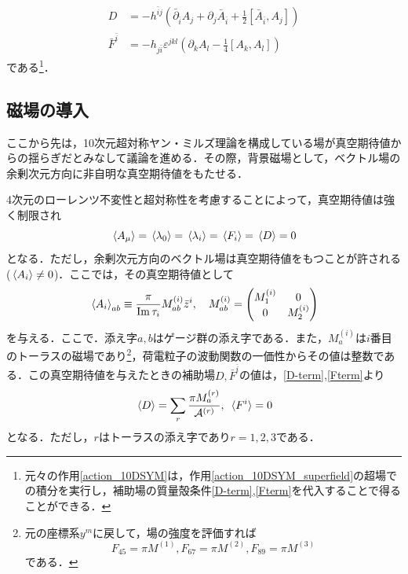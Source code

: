 \documentclass[a4paper,uplatex,dvipdfmx,10pt]{jsarticle}
\theoremstyle{definition}
\begin{document}
\begin{align}
   D
   &=
   -
   h^{\bar{i}j}
   \left(  
      \bar{\partial}_{\bar{i}}A_{j}
      +
      \partial_{j}\bar{A}_{\bar{i}}
      +
      \frac{1}{2}[\bar{A}_{\bar{i}},A_{j}]
   \right)
   \label{D-term}
   \\
   \bar{F}^{\bar{i}}
   &=
   -h_{j\bar{i}}
   \varepsilon^{jkl}
   \left(  
      \partial_{k}A_{l}
      -
      \frac{1}{4}[A_{k},A_{l}]
   \right)
   \label{Fterm}
\end{align}
である\footnote{
   元々の作用\eqref{action_10DSYM}は，作用\eqref{action_10DSYM_superfield}の超場での積分を実行し，補助場の質量殻条件\eqref{D-term},\eqref{Fterm}を代入することで得ることができる\cite{Abe_SuperfieldDescription_2012}．
}．


\subsection{磁場の導入}

ここから先は，10次元超対称ヤン・ミルズ理論を構成している場が真空期待値からの揺らぎだとみなして議論を進める．その際，背景磁場として，ベクトル場の余剰次元方向に非自明な真空期待値をもたせる．

4次元のローレンツ不変性と超対称性を考慮することによって，真空期待値は強く制限され
\begin{equation}
   \ev*{A_{\mu}}
   =
   \ev*{\lambda_{0}}
   =
   \ev*{\lambda_{i}}
   =
   \ev*{F_{i}}
   =
   \ev*{D}
   =
   0
   \nonumber
\end{equation}
となる．ただし，余剰次元方向のベクトル場は真空期待値をもつことが許される($\ev*{A_{i}}\neq 0$)．ここでは，その真空期待値として
\begin{equation}
   \ev*{A_{i}}_{ab}
   \equiv
   \frac{\pi}{\Im \tau_{i}} M_{ab}^{(i)}\bar{z}^{i}
   ,\quad
   M_{ab}^{(i)}
   =
   \begin{pmatrix}
     M_{1}^{(i)} & 0 \\
     0 & M_{2}^{(i)}
   \end{pmatrix}   
\end{equation}
を与える．ここで．添え字$a,b$はゲージ群の添え字である．また，$M_{a}^{(i)}$は$i$番目のトーラスの磁場であり\footnote{
   元の座標系$y^{m}$に戻して，場の強度を評価すれば
   $$
      F_{45}=\pi M^{(1)},F_{67}=\pi M^{(2)},F_{89}=\pi M^{(3)}
   $$
   である．
}，荷電粒子の波動関数の一価性からその値は整数である．この真空期待値を与えたときの補助場$D,\bar{F}^{\bar{i}}$の値は，\eqref{D-term},\eqref{Fterm}より
\begin{equation}
   \ev*{D}
   =
   \sum_{r}\frac{\pi M_{a}^{(r)}}{\mathcal{A}^{(r)}}
   ,\ 
   \ev*{F^{i}}
   =
   0
   \label{VEV_D}
\end{equation}
となる．ただし，$r$はトーラスの添え字であり$r=1,2,3$である．
\end{document}
